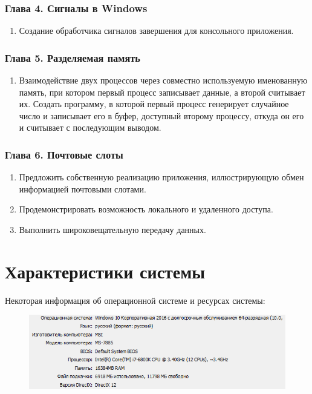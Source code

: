 \documentclass[14pt,a4paper,report]{report}
\begin{document}
\subsubsection{Глава 4. Сигналы в Windows}

\begin{enumerate}
	\item Создание обработчика сигналов завершения для консольного приложения.
\end{enumerate}

\subsubsection{Глава 5. Разделяемая память}

\begin{enumerate}
	\item Взаимодействие двух процессов через совместно используемую именованную память, при котором первый процесс записывает данные, а второй считывает их. Создать программу, в которой первый процесс генерирует случайное число и записывает его в буфер, доступный второму процессу, откуда он его и считывает с последующим выводом.
\end{enumerate}

\subsubsection{Глава 6. Почтовые слоты}

\begin{enumerate}
	\item Предложить собственную реализацию приложения, иллюстрирующую обмен информацией почтовыми слотами.
	\item Продемонстрировать возможность локального и удаленного доступа.
	\item Выполнить широковещательную передачу данных.
\end{enumerate}

\section{Характеристики системы}

Некоторая информация об операционной системе и ресурсах системы:

\begin{figure}[h!]
	\centering
	\includegraphics[scale = 1.05]{images/0.png}
	
	\caption{}
	\label{image:1}
\end{figure}
\end{document}
